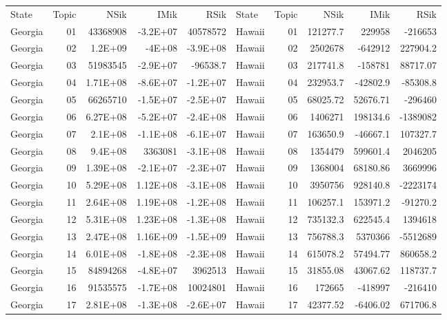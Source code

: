 \begin{table}[]
	\footnotesize
	\begin{tabular}{lrrrrlrrrr}
		State & Topic & NSik & IMik & RSik & State & Topic & NSik & IMik & RSik \\
		Georgia &  01  & 43368908 & -3.2E+07 & 40578572 & Hawaii &  01  & 121277.7 & 229958 & -216653 \\
		Georgia &  02  & 1.2E+09 & -4E+08 & -3.9E+08 & Hawaii &  02  & 2502678 & -642912 & 227904.2 \\
		Georgia &  03  & 51983545 & -2.9E+07 & -96538.7 & Hawaii &  03  & 217741.8 & -158781 & 88717.07 \\
		Georgia &  04  & 1.71E+08 & -8.6E+07 & -1.2E+07 & Hawaii &  04  & 232953.7 & -42802.9 & -85308.8 \\
		Georgia &  05  & 66265710 & -1.5E+07 & -2.5E+07 & Hawaii &  05  & 68025.72 & 52676.71 & -296460 \\
		Georgia &  06  & 6.27E+08 & -5.2E+07 & -2.4E+08 & Hawaii &  06  & 1406271 & 198134.6 & -1389082 \\
		Georgia &  07  & 2.1E+08 & -1.1E+08 & -6.1E+07 & Hawaii &  07  & 163650.9 & -46667.1 & 107327.7 \\
		Georgia &  08  & 9.4E+08 & 3363081 & -3.1E+08 & Hawaii &  08  & 1354479 & 599601.4 & 2046205 \\
		Georgia &  09  & 1.39E+08 & -2.1E+07 & -2.3E+07 & Hawaii &  09  & 1368004 & 68180.86 & 3669996 \\
		Georgia &  10 & 5.29E+08 & 1.12E+08 & -3.1E+08 & Hawaii &  10 & 3950756 & 928140.8 & -2223174 \\
		Georgia &  11 & 2.64E+08 & 1.19E+08 & -1.2E+08 & Hawaii &  11 & 106257.1 & 153971.2 & -91270.2 \\
		Georgia &  12 & 5.31E+08 & 1.23E+08 & -1.3E+08 & Hawaii &  12 & 735132.3 & 622545.4 & 1394618 \\
		Georgia &  13 & 2.47E+08 & 1.16E+09 & -1.5E+09 & Hawaii &  13 & 756788.3 & 5370366 & -5512689 \\
		Georgia &  14 & 6.01E+08 & -1.8E+08 & -2.3E+08 & Hawaii &  14 & 615078.2 & 57494.77 & 860658.2 \\
		Georgia &  15 & 84894268 & -4.8E+07 & 3962513 & Hawaii &  15 & 31855.08 & 43067.62 & 118737.7 \\
		Georgia &  16 & 91535575 & -1.7E+08 & 10024801 & Hawaii &  16 & 172665 & -418997 & -216410 \\
		Georgia &  17 & 2.81E+08 & -1.3E+08 & -2.6E+07 & Hawaii &  17 & 42377.52 & -6406.02 & 671706.8 \\

\end{tabular}
\end{table}
